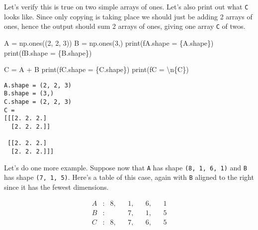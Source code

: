 \documentclass[
  letterpaper,
  DIV=11,
  numbers=noendperiod]{scrreprt}
\newenvironment{Shaded}{\begin{snugshade}}{\end{snugshade}}
\newcommand{\BuiltInTok}[1]{\textcolor[rgb]{0.00,0.23,0.31}{#1}}
\newcommand{\CharTok}[1]{\textcolor[rgb]{0.13,0.47,0.30}{#1}}
\newcommand{\DecValTok}[1]{\textcolor[rgb]{0.68,0.00,0.00}{#1}}
\newcommand{\NormalTok}[1]{\textcolor[rgb]{0.00,0.23,0.31}{#1}}
\newcommand{\OperatorTok}[1]{\textcolor[rgb]{0.37,0.37,0.37}{#1}}
\newcommand{\SpecialCharTok}[1]{\textcolor[rgb]{0.37,0.37,0.37}{#1}}
\newcommand{\SpecialStringTok}[1]{\textcolor[rgb]{0.13,0.47,0.30}{#1}}
\begin{document}
Let's verify this is true on two simple arrays of ones. Let's also print
out what \texttt{C} looks like. Since only copying is taking place we
should just be adding 2 arrays of ones, hence the output should sum 2
arrays of ones, giving one array \texttt{C} of twos.

\begin{Shaded}
\begin{Highlighting}[]
\NormalTok{A }\OperatorTok{=}\NormalTok{ np.ones((}\DecValTok{2}\NormalTok{, }\DecValTok{2}\NormalTok{, }\DecValTok{3}\NormalTok{))}
\NormalTok{B }\OperatorTok{=}\NormalTok{ np.ones(}\DecValTok{3}\NormalTok{,)}
\BuiltInTok{print}\NormalTok{(}\SpecialStringTok{f\textquotesingle{}A.shape = }\SpecialCharTok{\{}\NormalTok{A}\SpecialCharTok{.}\NormalTok{shape}\SpecialCharTok{\}}\SpecialStringTok{\textquotesingle{}}\NormalTok{)}
\BuiltInTok{print}\NormalTok{(}\SpecialStringTok{f\textquotesingle{}B.shape = }\SpecialCharTok{\{}\NormalTok{B}\SpecialCharTok{.}\NormalTok{shape}\SpecialCharTok{\}}\SpecialStringTok{\textquotesingle{}}\NormalTok{)}

\NormalTok{C }\OperatorTok{=}\NormalTok{ A }\OperatorTok{+}\NormalTok{ B}
\BuiltInTok{print}\NormalTok{(}\SpecialStringTok{f\textquotesingle{}C.shape = }\SpecialCharTok{\{}\NormalTok{C}\SpecialCharTok{.}\NormalTok{shape}\SpecialCharTok{\}}\SpecialStringTok{\textquotesingle{}}\NormalTok{)}
\BuiltInTok{print}\NormalTok{(}\SpecialStringTok{f\textquotesingle{}C = }\CharTok{\textbackslash{}n}\SpecialCharTok{\{}\NormalTok{C}\SpecialCharTok{\}}\SpecialStringTok{\textquotesingle{}}\NormalTok{)}
\end{Highlighting}
\end{Shaded}

\begin{verbatim}
A.shape = (2, 2, 3)
B.shape = (3,)
C.shape = (2, 2, 3)
C = 
[[[2. 2. 2.]
  [2. 2. 2.]]

 [[2. 2. 2.]
  [2. 2. 2.]]]
\end{verbatim}

Let's do one more example. Suppose now that \texttt{A} has shape
\texttt{(8,\ 1,\ 6,\ 1)} and \texttt{B} has shape \texttt{(7,\ 1,\ 5)}.
Here's a table of this case, again with \texttt{B} aligned to the right
since it has the fewest dimensions.

\begin{align*}
A &:& 8, & & 1, & & 6, & & 1 \\
B &:&    & & 7, & & 1, & & 5 \\
\hline
C &:& 8, & & 7, & & 6, & & 5 \\
\end{align*}
\end{document}
